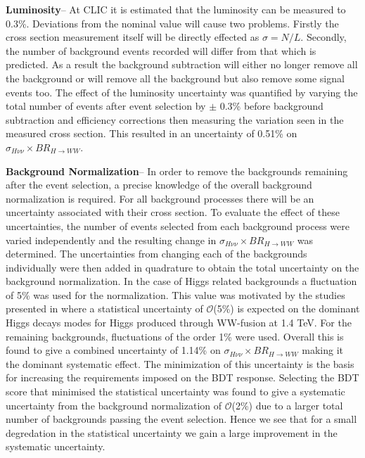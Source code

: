 \textbf{Luminosity}-- At \ac{CLIC} it is estimated that the luminosity can be measured to 0.3\%. Deviations from the nominal value will cause two problems. Firstly the cross section measurement itself will be directly effected as $\sigma=N/L$. Secondly, the number of background events recorded will differ from that which is predicted. As a result the background subtraction will either no longer remove all the background or will remove all the background but also remove some signal events too. The effect of the luminosity uncertainty was quantified by varying the total number of events after event selection by $\pm$ 0.3\% before background subtraction and efficiency corrections then measuring the variation seen in the measured cross section. This resulted in an uncertainty of 0.51\% on $\sigma_{H\nu\nu}\times BR_{H\rightarrow WW}$.

\textbf{Background Normalization}-- In order to remove the backgrounds remaining after the event selection, a precise knowledge of the overall background normalization is required. For all background processes there will be an uncertainty associated with their cross section. To evaluate the effect of these uncertainties, the number of events selected from each background process were varied independently and the resulting change in $\sigma_{H\nu\nu}\times BR_{H\rightarrow WW}$ was determined. The uncertainties from changing each of the backgrounds individually were then added in quadrature to obtain the total uncertainty on the background normalization. In the case of Higgs related backgrounds a fluctuation of 5\% was used for the normalization. This value was motivated by the studies presented in  \cite{Abramowicz:2016zbo} where a statistical uncertainty of $\mathcal{O}$(5\%) is expected on the dominant Higgs decays modes for Higgs produced through WW-fusion at 1.4 TeV. For the remaining backgrounds, fluctuations of the order 1\% were used. Overall this is found to give a combined uncertainty of 1.14\% on $\sigma_{H\nu\nu}\times BR_{H\rightarrow WW}$ making it the dominant systematic effect. The minimization of this uncertainty is the basis for increasing the requirements imposed on the BDT response. Selecting the BDT score that minimised the statistical uncertainty was found to give a systematic uncertainty from the background normalization of $\mathcal{O}$(2\%) due to a larger total number of backgrounds passing the event selection. Hence we see that for a small degredation in the statistical uncertainty we gain a large improvement in the systematic uncertainty.


